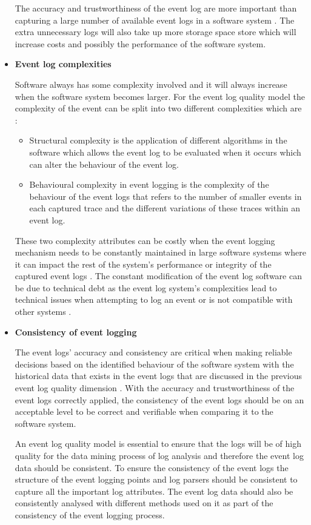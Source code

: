\begin{itemize}
	The accuracy and trustworthiness of the event log are more important than capturing a large number of available event logs in a software system \cite{Zhu2015, Jans2012}. The extra unnecessary logs will also take up more storage space store which will increase costs and possibly the performance of the software system. 

	\item \textbf{Event log complexities}\par Software always has some complexity involved and it will always increase when the software system becomes larger. For the event log quality model the complexity of the event can be split into two different complexities which are \cite{Kherbouche2017}:

	\begin{itemize}
		\item Structural complexity is the application of different algorithms in the software which allows the event log to be evaluated when it occurs which can alter the behaviour of the event log.
		\item Behavioural complexity in event logging is the complexity of the behaviour of the event logs that refers to the number of smaller events in each captured trace and the different variations of these traces within an event log.
	\end{itemize}

	These two complexity attributes can be costly when the event logging mechanism needs to be constantly maintained in large software systems where it can impact the rest of the system's performance or integrity of the captured event logs \cite{Ogheneovo2014}. The constant modification of the event log software can be due to technical debt as the event log system's complexities lead to technical issues when attempting to log an event or is not compatible with other systems \cite{DeLeon-Sigg2020}.  

 	\item \textbf{Consistency of event logging}\par The event logs' accuracy and consistency are critical when making reliable decisions based on the identified behaviour of the software system with the historical data that exists in the event logs that are discussed in the previous event log quality dimension \cite{Stojanov2017, Kherbouche2017}. With the accuracy and trustworthiness of the event logs correctly applied, the consistency of the event logs should be on an acceptable level to be correct and verifiable when comparing it to the software system. \par An event log quality model is essential to ensure that the logs will be of high quality for the data mining process of log analysis and therefore the event log data should be consistent. To ensure the consistency of the event logs the structure of the event logging points and log parsers should be consistent to capture all the important log attributes. The event log data should also be consistently analysed with different methods used on it as part of the consistency of the event logging process.


\end{itemize}
